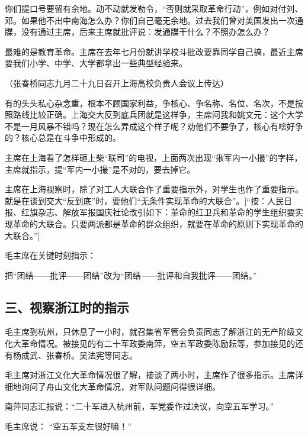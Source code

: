 你们提口号要留有余地。动不动就发勒令，“否则就采取革命行动”，例如对付刘、邓。如果他不出中南海怎么办？你们自己毫无余地。过去我们曾对美国发出一次通牒，没有通过主席，后来主席就批评说：发通牒干什么？不照办怎么办？

最难的是教育革命。主席在去年七月份就讲学校斗批改要靠同学自己搞，最近主席要我们小学、中学、大学都拿出一些典型经验来。

{\raggedleft （张春桥同志九月二十九日召开上海高校负责人会议上传达）

有的头头私心杂念重，根本不顾国家利益，争核心、争名称、名位、名次，不是按照路线比较正确。上海交大反到底兵团就是这样争，主席问我和姚文元：这个大学不是一月风暴不错吗？现在怎么弄成这个样子呢？劝他们不要争了，核心有啥好争的？核心总是在斗争中形成的。


主席在上海看了怎样砸上柴“联司”的电视，上面两次出现“揪军内一小撮”的字样，主席就指示，提“军内一小撮”是不对的，要去掉它。

主席在上海视察时，除了对工人大联合作了重要指示外，对学生也作了重要指示。就是在谈到交大“反到底”时，要他们“无条件实现革命的大联合”。[“按：人民日报、红旗杂志、解放军报国庆社论改引如下：革命的红卫兵和革命的学生组织要实现革命的大联合。只要两派都是革命的群众组织，就要在革命的原则下实现革命的大联合。”]


毛主席在关键时刻指示：

把“团结——批评——团结”改为“团结——批评和自我批评——团结。”


\subsection{三、视察浙江时的指示}

毛主席到杭州，只休息了一小时，就召集省军管会负责同志了解浙江的无产阶级文化大革命情况。被接见的有二十军政委南萍，空五军政委陈励耘等，参加接见的还有杨成武、张春桥。吴法宪等同志。

毛主席对浙江文化大革命情况很了解，接谈了两小时，主席作了很多指示。主席详细地询问了舟山文化大革命情况，对军队问题问得很详细。

南萍同志汇报说：“二十军进入杭州前，军党委作过决议，向空五军学习。”

毛主席说： “空五军支左很好嘛！”

}
